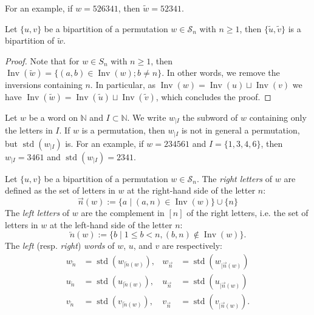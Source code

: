 \documentclass[Unicode]{cedram-alco}
\theoremstyle{definition}
\newcommand{\Sym}[1]{\mathcal{S}_{#1}}
\newcommand{\Symn}{\Sym{n}}
\newcommand{\NN}{\mathbb{N}}
\DeclareMathOperator{\std}{std}
\newcommand{\rest}[2]{#1_{|#2}}
\newcommand{\srest}[2]{\std(#1_{|#2})}
\DeclareMathOperator{\invs}{Inv}
\newcommand{\dec}[1]{\widetilde{#1}}
\newcommand{\R}{{\overrightarrow{n}}}
\newcommand{\LL}{{\overleftarrow{n}}}
\begin{document}
For an example, if $w = 526341$, then $\dec{w} = 52341$.

\begin{lemm}
\label{lem:dec}
Let $\lbrace u, v \rbrace$ be a bipartition of a permutation $w \in \Symn$ with $n \geq 1$, then $\lbrace \dec{u}, \dec{v} \rbrace$ is a bipartition of $\dec{w}$.
\end{lemm}

\begin{proof}
Note that for $w \in S_n$ with $n \geq 1$, then $\invs(\dec{w}) = \lbrace (a,b) \in \invs(w); b \neq n \rbrace$. In other words, we remove the inversions containing $n$. In particular, as $\invs(w) = \invs(u) \sqcup \invs(v)$ we have $\invs(\dec{w}) = \invs(\dec{u}) \sqcup \invs(\dec{v})$, which concludes the proof.
\end{proof}


Let $w$ be a word on $\NN$ and $I \subset \NN$. We write $\rest{w}{I}$ the subword of $w$ containing only the letters in $I$. If $w$ is a permutation, then $\rest{w}{I}$ is not in general a permutation, but $\srest{w}{I}$ is. For an example, if $w = 234561$ and $I = \lbrace 1, 3, 4, 6 \rbrace$, then $\rest{w}{I} = 3461$ and $\srest{w}{I} = 2341$.


\begin{defi}
\label{def:decomp}
Let $\lbrace u, v \rbrace$ be a bipartition of a permutation $w \in \Symn$. The \emph{right letters} of $w$ are defined as the set of letters in $w$ at the right-hand side of the letter $n$:
\begin{equation*}
\R (w) := \lbrace a\mid (a,n) \in \invs(w) \rbrace \cup \lbrace n \rbrace
\end{equation*}
The \emph{left letters} of $w$ are the complement in $[n]$ of the right letters, i.e. the set of letters in $w$ at the left-hand side of the letter $n$:
\begin{equation*}
\LL(w) := \lbrace b\mid 1 \leq b < n, (b,n) \not\in \invs(w) \rbrace.
\end{equation*}
The {\em left} (resp. {\em right}) {\em words} of $w$, $u$, and $v$ are respectively:
\begin{align*}
w_\LL &= \srest{w}{\LL(w)}, & w_\R &= \srest{w}{\R(w)} \\
u_\LL &= \srest{u}{\LL(w)}, & u_\R &= \srest{u}{\R(w)} \\
v_\LL &= \srest{v}{\LL(w)}, & v_\R &= \srest{v}{\R(w)}. 
\end{align*}
\end{defi}
\end{document}
